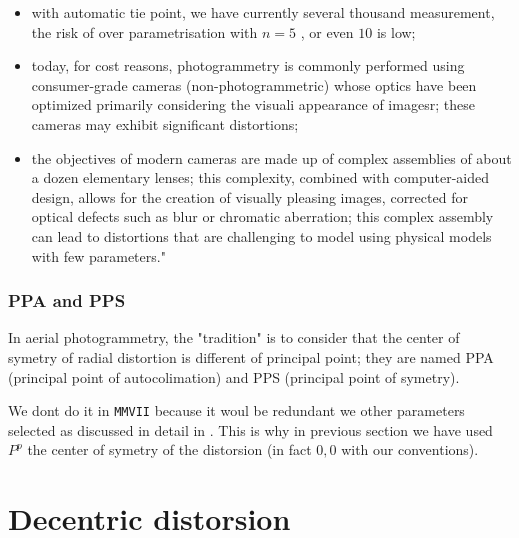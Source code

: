 \begin{itemize}
         \item   with automatic tie point, we have currently several thousand measurement, the risk of over parametrisation
                 with $n=5$ , or even $10$ is low;

         \item today, for cost reasons, photogrammetry is commonly performed using consumer-grade cameras 
                 (non-photogrammetric) whose optics have been optimized primarily considering the visuali
                 appearance of imagesr; these cameras may exhibit significant distortions;

         \item  the objectives of modern cameras are made up of complex assemblies of about a dozen elementary lenses;
                this complexity, combined with computer-aided design, allows for the creation of visually pleasing images,
                corrected for optical defects such as blur or chromatic aberration; this complex assembly can lead to 
                 distortions that are challenging to model using physical models with few parameters."

\end{itemize}


\subsubsection{PPA and PPS}

In aerial photogrammetry, the "tradition" is to consider that the center of symetry of radial distortion
is different of principal point; they are named PPA (principal point of autocolimation) and
PPS (principal point of symetry).

We dont do it in {\tt MMVII} because it woul be redundant we other parameters 
selected as discussed in detail in \label{PPA:PPS:DEC}.
This is why in previous section we have used $P^p$ the center of symetry of the distorsion 
(in fact $0,0$ with our conventions).


\section{Decentric distorsion}
\label{DecMod}

